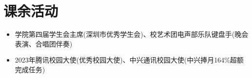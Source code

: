 \section{课余活动}
\begin{itemize}[parsep=0.2ex]
  \item 学院第四届学生会主席(深圳市优秀学生会)、校艺术团电声部乐队键盘手(晚会表演、合唱团伴奏)
  \item 2023年腾讯校园大使(优秀校园大使)、中兴通讯校园大使(中兴捧月164\%超额完成任务)
\end{itemize}
